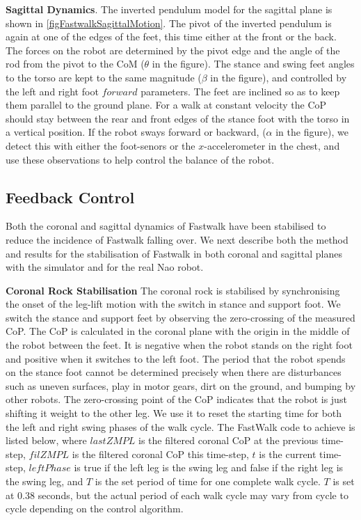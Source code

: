 \documentclass[pdftex,11pt,a4paper]{report}
\begin{document}
\textbf{Sagittal Dynamics}. The inverted pendulum model for the sagittal plane is shown in \autoref{figFastwalkSagittalMotion}. The pivot of the inverted pendulum is again at one of the edges of the feet, this time either at the front or the back. The forces on the robot are determined by the pivot edge and the angle of the rod from the pivot to the CoM ($\theta$ in the figure). The stance and swing feet angles to the torso are kept to the same magnitude ($\beta$ in the figure), and controlled by the left and right foot $forward$ parameters. The feet are inclined so as to keep them parallel to the ground plane. For a walk at constant velocity the CoP should stay between the rear and front edges of the stance foot with the torso in a vertical position. If the robot sways forward or backward, ($\alpha$ in the figure), we detect this with either the foot-senors or the $x$-accelerometer in the chest, and use these observations to help control the balance of the robot.  


\subsection{Feedback Control}\label{sectionFastWalkFeedbackControl}
Both the coronal and sagittal dynamics of Fastwalk have been stabilised to reduce the incidence of Fastwalk falling over. We next describe both the method and results for the stabilisation of Fastwalk in both coronal and sagittal planes with the simulator and for the real Nao robot.

\textbf{Coronal Rock Stabilisation}
The coronal rock is stabilised by synchronising the onset of the leg-lift motion with the switch in stance and support foot. We switch the stance and support feet by observing the zero-crossing of the measured CoP. The CoP is calculated in the coronal plane with the origin in the middle of the robot between the feet. It is negative when the robot stands on the right foot and positive when it switches to the left foot. The period that the robot spends on the stance foot cannot be determined precisely when there are disturbances such as uneven surfaces, play in motor gears, dirt on the ground, and bumping by other robots. The zero-crossing point of the CoP indicates that the robot is just shifting it weight to the other leg. We use it to reset the starting time for both the left and right swing phases of the walk cycle. The FastWalk code to achieve is listed below, where $lastZMPL$ is the filtered coronal CoP at the previous time-step, $filZMPL$ is the filtered coronal CoP this time-step, $t$ is the current time-step, $leftPhase$ is true if the left leg is the swing leg and false if the right leg is the swing leg, and $T$ is the set period of time for one complete walk cycle. $T$ is set at 0.38 seconds, but the actual period of each walk cycle may vary from cycle to cycle depending on the control algorithm.  
\end{document}
